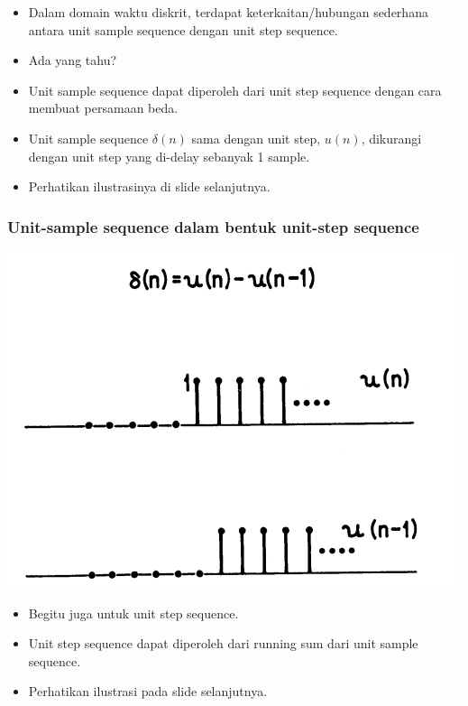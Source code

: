 \documentclass[pdflatex,compress]{beamer}
\begin{document}
\begin{frame}
	\begin{itemize}
		\item<1-> Dalam domain waktu diskrit, terdapat keterkaitan/hubungan sederhana antara unit sample sequence dengan unit step sequence.
		\item<2-> Ada yang tahu?
		\item<3-> Unit sample sequence dapat diperoleh dari unit step sequence dengan cara membuat persamaan beda.
		\item<3-> Unit sample sequence $ \delta (n) $ sama dengan unit step, $ u(n) $, dikurangi dengan unit step yang di-delay sebanyak 1 sample.
		\item<4-> Perhatikan ilustrasinya di slide selanjutnya.
	\end{itemize}
\end{frame}

\begin{frame}
	\frametitle{Unit-sample sequence dalam bentuk unit-step sequence}
	\begin{center}
		\includegraphics[height=0.8\textheight]{img/img007}
	\end{center}
\end{frame}

\begin{frame}
	\begin{itemize}
		\item Begitu juga untuk unit step sequence.
		\item Unit step sequence dapat diperoleh dari running sum dari unit sample sequence.
		\item Perhatikan ilustrasi pada slide selanjutnya.
	\end{itemize}
\end{frame}
\end{document}
